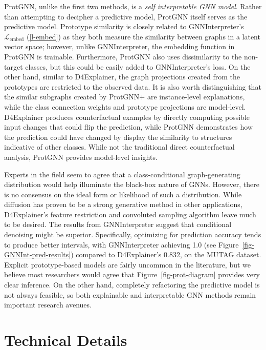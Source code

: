 \documentclass[
  11pt,
  letterpaper,
]{article}
\begin{document}
\quad ProtGNN, unlike the first two methods, is a \emph{self
interpretable GNN model}. Rather than attempting to decipher a
predictive model, ProtGNN itself serves as the predictive model.
Prototype similarity is closely related to GNNInterpreter's
\(\mathcal{L}_\text{embed}\) (\ref{l-embed}) as they both measure the
similarity between graphs in a latent vector space; however, unlike
GNNInterpreter, the embedding function in ProtGNN is trainable.
Furthermore, ProtGNN also uses dissimilarity to the non-target classes,
but this could be easily added to GNNInterpreter's loss. On the other
hand, similar to D4Explainer, the graph projections created from the
prototypes are restricted to the observed data. It is also worth
distinguishing that the similar subgraphs created by ProtGNN+ are
instance-level explanations, while the class connection weights and
prototype projections are model-level. D4Explainer produces
counterfactual examples by directly computing possible input changes
that could flip the prediction, while ProtGNN demonstrates how the
prediction could have changed by display the similarity to structures
indicative of other classes. While not the traditional direct
counterfactual analysis, ProtGNN provides model-level insights.

\quad Experts in the field seem to agree that a class-conditional
graph-generating distribution would help illuminate the black-box nature
of GNNs. However, there is no consensus on the ideal form or likelihood
of such a distribution. While diffusion has proven to be a strong
generative method in other applications, D4Explainer's feature
restriction and convoluted sampling algorithm leave much to be desired.
The results from GNNInterpreter suggest that conditional denoising might
be superior. Specifically, optimizing for prediction accuracy tends to
produce better intervals, with GNNInterpreter achieving 1.0 (see
Figure~\ref{fig-GNNInt-pred-results}) compared to D4Explainer's 0.832,
on the MUTAG dataset. Explicit prototype-based models are fairly
uncommon in the literature, but we believe most researchers would agree
that Figure~\ref{fig-prot-diagram} provides very clear inference. On the
other hand, completely refactoring the predictive model is not always
feasible, so both explainable and interpretable GNN methods remain
important research avenues.

\hypertarget{technical-details}{%
\section{Technical Details}\label{technical-details}}
\end{document}
